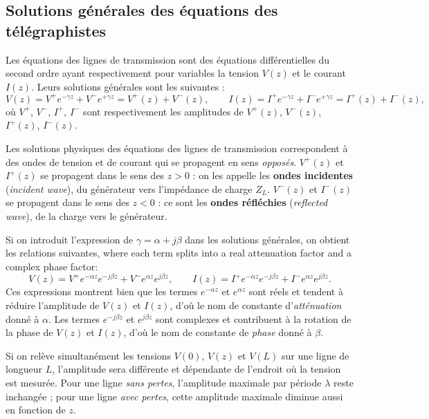 \subsection{Solutions générales des équations des télégraphistes}
Les équations des lignes de transmission sont des équations différentielles du
second ordre ayant respectivement pour variables la tension $V(z)$ et le
courant $I(z)$. Leurs solutions générales sont les suivantes :
\[
  V(z) = V^{+}e^{-\gamma z} + V^{-}e^{+\gamma z} = V^{+}(z) + V^{-}(z),
  \qquad
  I(z) = I^{+}e^{-\gamma z} + I^{-}e^{+\gamma z} = I^{+}(z) + I^{-}(z),
\]
où $V^{+}$, $V^{-}$, $I^{+}$, $I^{-}$ sont respectivement les amplitudes de
$V^{+}(z)$, $V^{-}(z)$, $I^{+}(z)$, $I^{-}(z)$.

\begin{definition}
  Les solutions physiques des équations des lignes de transmission
  correspondent à des ondes de tension et de courant qui se propagent en sens
  \emph{opposés}. $V^{+}(z)$ et $I^{+}(z)$ se propagent dans le sens des
  $z > 0$ : on les appelle les \textbf{ondes incidentes} (\textit{incident
  wave}), du générateur vers l'impédance de charge $Z_L$. $V^{-}(z)$ et
  $I^{-}(z)$ se propagent dans le sens des $z < 0$ : ce sont les \textbf{ondes
  réfléchies} (\textit{reflected wave}), de la charge vers le générateur.
\end{definition}

Si on introduit l'expression de $\gamma = \alpha + j\beta$ dans les solutions
générales, on obtient les relations suivantes, where each term splits into a
real attenuation factor and a complex phase factor:
\[
  V(z) = V^{+}e^{-\alpha z}e^{-j\beta z} + V^{-}e^{\alpha z}e^{j\beta z},
  \qquad
  I(z) = I^{+}e^{-\alpha z}e^{-j\beta z} + I^{-}e^{\alpha z}e^{j\beta z}.
\]
Ces expressions montrent bien que les termes $e^{-\alpha z}$ et $e^{\alpha z}$
sont réels et tendent à réduire l'amplitude de $V(z)$ et $I(z)$, d'où le nom de
constante d'\emph{atténuation} donné à $\alpha$. Les termes $e^{-j\beta z}$ et
$e^{j\beta z}$ sont complexes et contribuent à la rotation de la phase de
$V(z)$ et $I(z)$, d'où le nom de constante de \emph{phase} donné à $\beta$.

\begin{remark}
  Si on relève simultanément les tensions $V(0)$, $V(z)$ et $V(L)$ sur une
  ligne de longueur $L$, l'amplitude sera différente et dépendante de l'endroit
  où la tension est mesurée. Pour une ligne \emph{sans pertes}, l'amplitude
  maximale par période $\lambda$ reste inchangée ; pour une ligne \emph{avec
  pertes}, cette amplitude maximale diminue aussi en fonction de $z$.
\end{remark}

